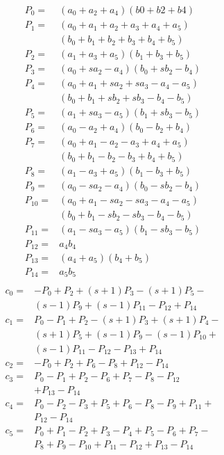 \documentclass{article}
\begin{document}
\begin{equation}
\begin{array}{ll}
P_0 = & (a_0+a_2+a_4)(b0+b2+b4)\\
P_1 = & (a_0+a_1+a_2+a_3+a_4+a_5)\\
& (b_0+b_1+b_2+b_3+b_4+b_5)\\
P_2 = &(a_1+a_3+a_5)(b_1+b_3+b_5)\\
P_3 = &(a_0+sa_2-a_4)(b_0+sb_2-b_4)\\
P_4 = &(a_0+a_1+sa_2+sa_3-a_4-a_5)\\
& (b_0+b_1+sb_2+sb_3-b_4-b_5)\\
P_5 = &(a_1+sa_3-a_5)(b_1+sb_3-b_5)\\
P_6 = & (a_0-a_2+a_4)(b_0-b_2+b_4)\\
P_7 = & (a_0+a_1-a_2-a_3+a_4+a_5)\\
& (b_0+b_1-b_2-b_3+b_4+b_5)\\
P_8 = & (a_1-a_3+a_5)(b_1-b_3+b_5)\\
P_9 = & (a_0-sa_2-a_4)(b_0-sb_2-b_4)\\
P_{10} = & (a_0+a_1-sa_2-sa_3-a_4-a_5)\\
& (b_0+b_1-sb_2-sb_3-b_4-b_5)\\
P_{11} = & (a_1-sa_3-a_5)(b_1-sb_3-b_5)\\
P_{12} = & a_4b_4\\
P_{13} = & (a_4+a_5)(b_4+b_5)\\
P_{14} = & a_5b_5\\
\end{array}
\label{equ:formulasinput}
\end{equation}
\newpage
\begin{equation}
\begin{array}{ll}
c_0 = & -P_0+P_2+(s+1)P_3-(s+1)P_5-\\
& (s-1) P_9+(s-1)P_{11}-P_{12}+P_{14}\\
c_1 = & P_0-P_1+P_2-(s+1)P_3+(s+1)P_4-\\
& (s+1)P_5+ (s-1)P_9-(s-1)P_{10}+\\
& (s-1)P_{11}-P_{12}-P_{13}+P_{14}\\
c_2 = & -P_{0}+P_{2}+P_{6}-P_{8}+P_{12}-P_{14}\\
c_3 = & P_{0}-P_{1}+P_{2}-P_{6}+P_{7}-P_{8}-P_{12}\\
& +P_{13}-P_{14}\\
c_4 = & P_{0}-P_{2}-P_{3}+P_{5}+P_{6}-P_{8}-P_{9}+P_{11}+\\
& P_{12}-P_{14}\\
c_5 = & P_{0}+P_{1}-P_{2}+P_{3}-P_{4}+P_{5}-P_{6}+P_{7}-\\
& P_{8}+P_{9}-P_{10}+P_{11}-P_{12}+P_{13}-P_{14}
\end{array}
\label{equ:formulasoutput}
\end{equation}
\end{document}
